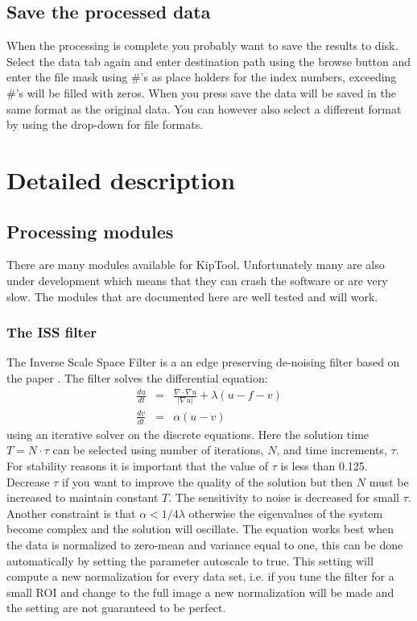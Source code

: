 \documentclass[a4paper]{scrreprt}
\begin{document}
\section{Save the processed data}
When the processing is complete you probably want to save the results to disk. Select the data tab again and enter destination path using the browse button and enter the file mask using \#'s as place holders for the index numbers, exceeding \#'s will be filled with zeros. When you press save the data will be saved in the same format as the original data. You can however also select a different format by using the drop-down for file formats. 

\chapter{Detailed description}
\section{Processing modules}
There are many modules available for KipTool. Unfortunately many are also under development which means that they can crash the software or are very slow. The modules that are documented here are well tested and will work.
\subsection{The ISS filter}
The Inverse Scale Space Filter is a an edge preserving de-noising filter based on the paper \cite{burger2006}. The filter solves the differential equation:
\begin{eqnarray}
\frac{du}{dt}&=&\frac{\nabla\cdot \nabla u}{|\nabla u|} + \lambda(u-f-v)\nonumber\\
\frac{dv}{dt}&=&\alpha (u-v)
\end{eqnarray}
using an iterative solver on the discrete equations. Here the solution time $T=N\cdot\tau$ can be selected using number of iterations, $N$, and time increments, $\tau$. For stability reasons it is important that the value of $\tau$ is less than 0.125. Decrease $\tau$ if you want to improve the quality of the solution but then $N$ must be increased to maintain constant $T$. The sensitivity to noise is decreased for small $\tau$. Another constraint is that $\alpha<1/4 \lambda$ otherwise the eigenvalues of the system become complex and the solution will oscillate. The equation works best when the data is normalized to zero-mean and variance equal to one, this can be done automatically by setting the parameter autoscale to true. This setting will compute a new normalization for every data set, i.e. if you tune the filter for a small ROI and change to the full image a new normalization will be made and the setting are not guaranteed to be perfect. 
\end{document}
